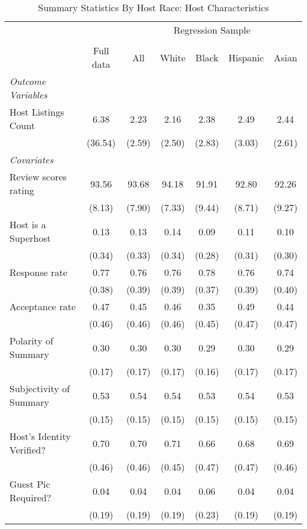 \begin{table}[htbp]
\caption{Summary Statistics By Host Race: Host Characteristics}
\begin{center}%
\small\begin{tabular}{l c | c | c c c c}
& \multicolumn{1}{c}{} & \multicolumn{5}{c}{Regression Sample}
\\
 \cmidrule(r){3-7}
\\
 & \multicolumn{1}{c}{Full data} & \multicolumn{1}{c}{All} & White & Black & Hispanic & Asian
\\
\hline\hline\noalign{\smallskip} 
 \textit{\textit{Outcome Variables}} & & & & & & \\ Host Listings Count & 6.38 & 2.23 & 2.16 & 2.38 & 2.49 & 2.44 \\
 & (36.54) & (2.59) & (2.50) & (2.83) & (3.03) & (2.61) \\
 \textit{Covariates} & & & & & & \\ \hline Review scores rating & 93.56 & 93.68 & 94.18 & 91.91 & 92.80 & 92.26 \\
 & (8.13) & (7.90) & (7.33) & (9.44) & (8.71) & (9.27) \\
 Host is a Superhost & 0.13 & 0.13 & 0.14 & 0.09 & 0.11 & 0.10 \\
 & (0.34) & (0.33) & (0.34) & (0.28) & (0.31) & (0.30) \\
 Response rate & 0.77 & 0.76 & 0.76 & 0.78 & 0.76 & 0.74 \\
 & (0.38) & (0.39) & (0.39) & (0.37) & (0.39) & (0.40) \\
 Acceptance rate & 0.47 & 0.45 & 0.46 & 0.35 & 0.49 & 0.44 \\
 & (0.46) & (0.46) & (0.46) & (0.45) & (0.47) & (0.47) \\
 Polarity of Summary & 0.30 & 0.30 & 0.30 & 0.29 & 0.30 & 0.29 \\
 & (0.17) & (0.17) & (0.17) & (0.16) & (0.17) & (0.17) \\
 Subjectivity of Summary & 0.53 & 0.54 & 0.54 & 0.53 & 0.54 & 0.53 \\
 & (0.15) & (0.15) & (0.15) & (0.15) & (0.15) & (0.15) \\
 Host's Identity Verified? & 0.70 & 0.70 & 0.71 & 0.66 & 0.68 & 0.69 \\
 & (0.46) & (0.46) & (0.45) & (0.47) & (0.47) & (0.46) \\
 Guest Pic Required? & 0.04 & 0.04 & 0.04 & 0.06 & 0.04 & 0.04 \\
 & (0.19) & (0.19) & (0.19) & (0.23) & (0.19) & (0.19) \\

\end{tabular}
\end{center}
\end{table}
